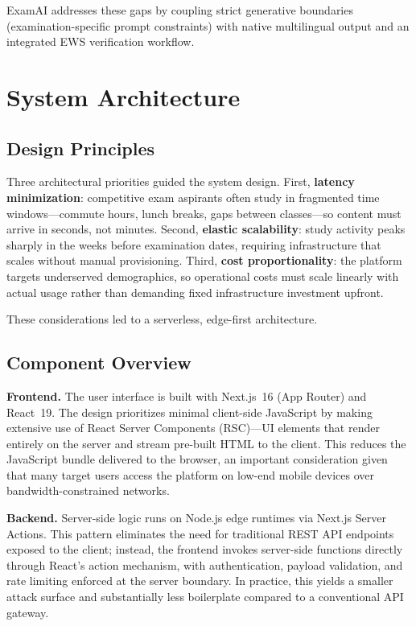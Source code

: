 \documentclass[conference]{IEEEtran}
\begin{document}
ExamAI addresses these gaps by coupling strict generative boundaries (examination-specific prompt constraints) with native multilingual output and an integrated EWS verification workflow.

\section{System Architecture}
\label{sec:architecture}

\subsection{Design Principles}

Three architectural priorities guided the system design. First, \textbf{latency minimization}: competitive exam aspirants often study in fragmented time windows---commute hours, lunch breaks, gaps between classes---so content must arrive in seconds, not minutes. Second, \textbf{elastic scalability}: study activity peaks sharply in the weeks before examination dates, requiring infrastructure that scales without manual provisioning. Third, \textbf{cost proportionality}: the platform targets underserved demographics, so operational costs must scale linearly with actual usage rather than demanding fixed infrastructure investment upfront.

These considerations led to a serverless, edge-first architecture.

\subsection{Component Overview}

\textbf{Frontend.} The user interface is built with Next.js~16 (App Router) and React~19. The design prioritizes minimal client-side JavaScript by making extensive use of React Server Components (RSC)---UI elements that render entirely on the server and stream pre-built HTML to the client. This reduces the JavaScript bundle delivered to the browser, an important consideration given that many target users access the platform on low-end mobile devices over bandwidth-constrained networks.

\textbf{Backend.} Server-side logic runs on Node.js edge runtimes via Next.js Server Actions. This pattern eliminates the need for traditional REST API endpoints exposed to the client; instead, the frontend invokes server-side functions directly through React's action mechanism, with authentication, payload validation, and rate limiting enforced at the server boundary. In practice, this yields a smaller attack surface and substantially less boilerplate compared to a conventional API gateway.
\end{document}

